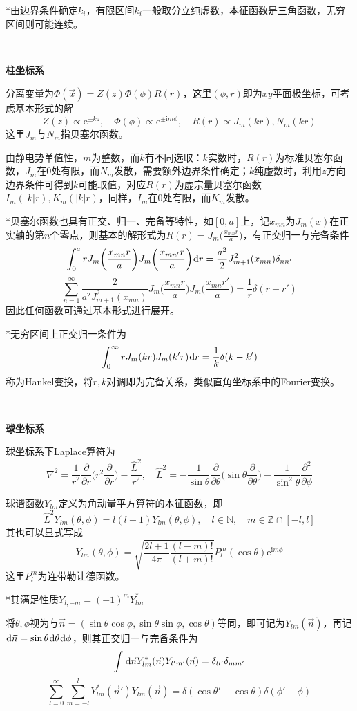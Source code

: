\documentclass[a4paper,UTF8,fontset=windows]{ctexart}
\newcommand*{\dr}{\hspace{0.07em}\mathrm{d}}
\newcommand*{\er}{\mathrm{e}}
\newcommand*{\ir}{\mathrm{i}}
\newcommand*{\vns}{\vec{n}}
\newcommand*{\vx}{\vec{x}}
\newcommand*{\pt}[2][t]{\frac{\partial #2}{\partial #1}}
\newcommand*{\ppt}[2][t^2]{\frac{\partial^2 #2}{\partial #1}}
\begin{document}
*由边界条件确定$k_i$，有限区间$k_i$一般取分立纯虚数，本征函数是三角函数，无穷区间则可能连续。

\

\textbf{柱坐标系}

分离变量为$\Phi(\vx)=Z(z)\Phi(\phi)R(r)$，这里$(\phi,r)$即为$xy$平面极坐标，可考虑基本形式的解
$$Z(z)\propto\er^{\pm kz},\quad\Phi(\phi)\propto\er^{\pm\ir m\phi},\quad R(r)\propto J_m(kr),N_m(kr)$$
这里$J_m$与$N_m$指贝塞尔函数。

由静电势单值性，$m$为整数，而$k$有不同选取：$k$实数时，$R(r)$为标准贝塞尔函数，$J_m$在0处有限，而$N_m$发散，需要额外边界条件确定；$k$纯虚数时，利用$z$方向边界条件可得到$k$可能取值，对应$R(r)$为虚宗量贝塞尔函数$I_m(|k|r),K_m(|k|r)$，同样，$I_m$在0处有限，而$K_m$发散。

*贝塞尔函数也具有正交、归一、完备等特性，如$[0,a]$上，记$x_{mn}$为$J_m(x)$在正实轴的第$n$个零点，则基本的解形式为$R(r)=J_m\big(\frac{x_{mn}r}{a}\big)$，有正交归一与完备条件
$$\int_0^arJ_m\bigg(\frac{x_{mn}r}{a}\bigg)J_m\bigg(\frac{x_{mn'}r}{a}\bigg)\dr r=\frac{a^2}{2}J_{m+1}^2(x_{mn})\delta_{nn'}$$
$$\sum_{n=1}^\infty\frac{2}{a^2J_{m+1}^2(x_{mn})}J_m\bigg(\frac{x_{mn}r}{a}\bigg)J_m\bigg(\frac{x_{mn}r'}{a}\bigg)=\frac{1}{r}\delta(r-r')$$
因此任何函数可通过基本形式进行展开。

*无穷区间上正交归一条件为
$$\int_0^\infty rJ_m(kr)J_m(k'r)\dr r=\frac{1}{k}\delta(k-k')$$
称为Hankel变换，将$r,k$对调即为完备关系，类似直角坐标系中的Fourier变换。

\

\textbf{球坐标系}

球坐标系下Laplace算符为
$$\nabla^2=\frac{1}{r^2}\pt[r]{}\bigg(r^2\pt[r]{}\bigg)-\frac{\hat{L}^2}{r^2},\quad\hat{L}^2=-\frac{1}{\sin\theta}\pt[\theta]{}\bigg(\sin\theta\pt[\theta]{}\bigg)-\frac{1}{\sin^2\theta}\ppt[\phi]{}$$

球谐函数$Y_{lm}$定义为角动量平方算符的本征函数，即
$$\hat{L}^2Y_{lm}(\theta,\phi)=l(l+1)Y_{lm}(\theta,\phi),\quad l\in\mathbb{N},\quad m\in\mathbb{Z}\cap[-l,l]$$
其也可以显式写成
$$Y_{lm}(\theta,\phi)=\sqrt{\frac{2l+1}{4\pi}\frac{(l-m)!}{(l+m)!}}P_l^m(\cos\theta)\er^{\ir m\phi}$$
这里$P_l^m$为连带勒让德函数。

*其满足性质$Y_{l,-m}=(-1)^mY_{lm}^*$

将$\theta,\phi$视为与$\vns=(\sin\theta\cos\phi,\sin\theta\sin\phi,\cos\theta)$等同，即可记为$Y_{lm}(\vns)$，再记$\dr\vns=\sin\theta\dr\theta\dr\phi$，则其正交归一与完备条件为
$$\int\dr\vns Y_{lm}^*(\vns)Y_{l'm'}(\vns)=\delta_{ll'}\delta_{mm'}$$
$$\sum_{l=0}^\infty\sum_{m=-l}^lY_{lm}^*(\vns')Y_{lm}(\vns)=\delta(\cos\theta'-\cos\theta)\delta(\phi'-\phi)$$
\end{document}
